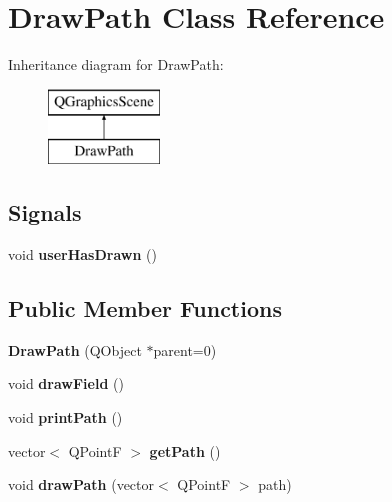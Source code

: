 \hypertarget{class_draw_path}{}\section{Draw\+Path Class Reference}
\label{class_draw_path}
Inheritance diagram for Draw\+Path\+:\begin{figure}[H]
\begin{center}
\leavevmode
\includegraphics[height=2.000000cm]{class_draw_path}
\end{center}
\end{figure}
\subsection*{Signals}
\begin{DoxyCompactItemize}
\item 
\hypertarget{class_draw_path_ae03f0fbd38de93d428303e576d6350fc}{}\label{class_draw_path_ae03f0fbd38de93d428303e576d6350fc} 
void {\bfseries user\+Has\+Drawn} ()
\end{DoxyCompactItemize}
\subsection*{Public Member Functions}
\begin{DoxyCompactItemize}
\item 
\hypertarget{class_draw_path_aea210b1571af3051097fd3724b3de42c}{}\label{class_draw_path_aea210b1571af3051097fd3724b3de42c} 
{\bfseries Draw\+Path} (Q\+Object $\ast$parent=0)
\item 
\hypertarget{class_draw_path_a81d8d873f247eb29008dfbe4110b56ac}{}\label{class_draw_path_a81d8d873f247eb29008dfbe4110b56ac} 
void {\bfseries draw\+Field} ()
\item 
\hypertarget{class_draw_path_a73baf263dfdf3b1cc76b973547a94712}{}\label{class_draw_path_a73baf263dfdf3b1cc76b973547a94712} 
void {\bfseries print\+Path} ()
\item 
\hypertarget{class_draw_path_a51daca7fb10e584cea8040dc1ca7bb6e}{}\label{class_draw_path_a51daca7fb10e584cea8040dc1ca7bb6e} 
vector$<$ Q\+PointF $>$ {\bfseries get\+Path} ()
\item 
\hypertarget{class_draw_path_af28189ce534f4ba3dbbce2b601746d69}{}\label{class_draw_path_af28189ce534f4ba3dbbce2b601746d69} 
void {\bfseries draw\+Path} (vector$<$ Q\+PointF $>$ path)
\end{DoxyCompactItemize}
